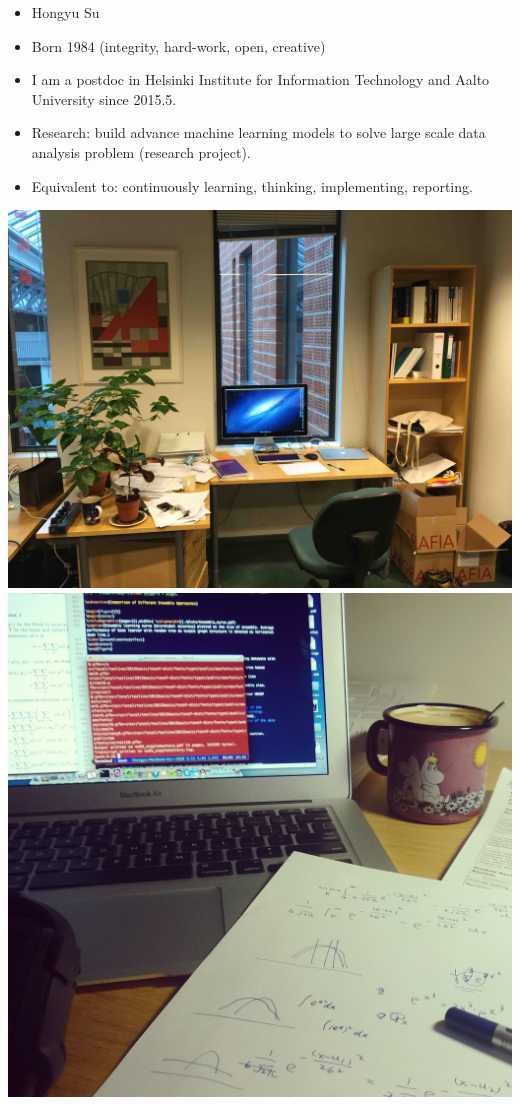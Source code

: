 \documentclass[first=dgreen,second=purple,logo=yellowexc]{aaltoslides}
\begin{document}
\begin{frame}{}
	\begin{itemize}
		\item Hongyu Su
		\item Born 1984 (integrity, hard-work, open, creative)
		\item I am a postdoc in Helsinki Institute for Information Technology and Aalto University since 2015.5.
		\item Research: build advance machine learning models to solve large scale data analysis problem (research project).
		\item Equivalent to: continuously learning, thinking, implementing, reporting.
	\end{itemize}
	\begin{center}
		\includegraphics[scale = 0.04]{./plots/office1.jpg}
		\includegraphics[scale = 0.1]{./plots/office2.jpg}
	\end{center}
\end{frame}
\end{document}
